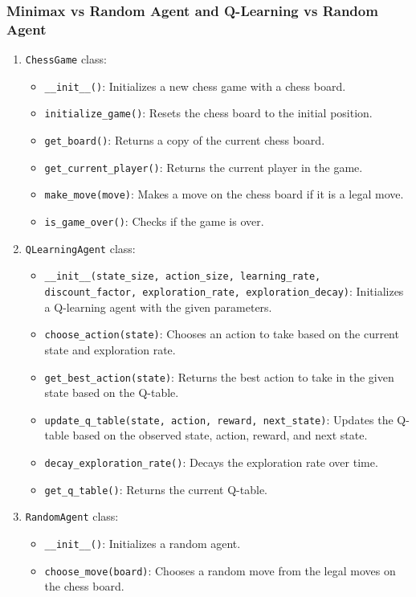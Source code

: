 \documentclass{article}
\begin{document}
\subsubsection{Minimax vs Random Agent and  Q-Learning vs Random Agent}
\begin{enumerate}
  \item \texttt{ChessGame} class:
    \begin{itemize}
      \item \texttt{\_\_init\_\_()}: Initializes a new chess game with a chess board.
      \item \texttt{initialize\_game()}: Resets the chess board to the initial position.
      \item \texttt{get\_board()}: Returns a copy of the current chess board.
      \item \texttt{get\_current\_player()}: Returns the current player in the game.
      \item \texttt{make\_move(move)}: Makes a move on the chess board if it is a legal move.
      \item \texttt{is\_game\_over()}: Checks if the game is over.
    \end{itemize}

  \item \texttt{QLearningAgent} class:
    \begin{itemize}
      \item \texttt{\_\_init\_\_(state\_size, action\_size, learning\_rate, discount\_factor, exploration\_rate, exploration\_decay)}: Initializes a Q-learning agent with the given parameters.
      \item \texttt{choose\_action(state)}: Chooses an action to take based on the current state and exploration rate.
      \item \texttt{get\_best\_action(state)}: Returns the best action to take in the given state based on the Q-table.
      \item \texttt{update\_q\_table(state, action, reward, next\_state)}: Updates the Q-table based on the observed state, action, reward, and next state.
      \item \texttt{decay\_exploration\_rate()}: Decays the exploration rate over time.
      \item \texttt{get\_q\_table()}: Returns the current Q-table.
    \end{itemize}

  \item \texttt{RandomAgent} class:
    \begin{itemize}
      \item \texttt{\_\_init\_\_()}: Initializes a random agent.
      \item \texttt{choose\_move(board)}: Chooses a random move from the legal moves on the chess board.
    \end{itemize}


\end{enumerate}
\end{document}
